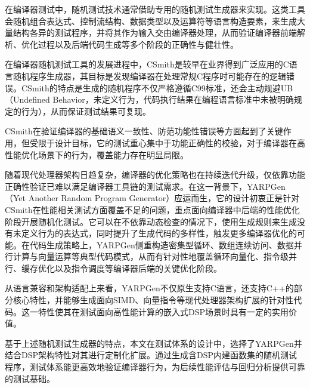 \par

在编译器测试中，随机测试技术通常借助专用的随机测试生成器来实现。这类工具会随机组合表达式、控制流结构、数据类型以及运算符等语言构造要素，来生成大量结构各异的测试程序，并将其作为输入交由编译器处理，从而验证编译器前端解析、优化过程以及后端代码生成等多个阶段的正确性与健壮性。

\par

在编译器随机测试工具的发展进程中，CSmith\cite{tamkun2021using}是较早在业界得到广泛应用的C语言随机程序生成器，其目标是发现编译器在处理常规C程序时可能存在的逻辑错误。CSmith的特点是生成的随机程序不仅严格遵循C99标准，还会主动规避UB（Undefined Behavior，未定义行为，代码执行结果在编程语言标准中未被明确规定的行为），从而保证测试结果可复现。

\par

CSmith在验证编译器的基础语义一致性、防范功能性错误等方面起到了关键作用，但受限于设计目标，它的测试重心集中于功能正确性的校验，对于编译器在高性能优化场景下的行为，覆盖能力存在明显局限。

\par

随着现代处理器架构日趋复杂，编译器的优化策略也在持续迭代升级，仅依靠功能正确性验证已难以满足编译器工具链的测试需求。在这一背景下，YARPGen（Yet Another Random Program Generator）\cite{livinskii2020random, livinskii2023fuzzing}应运而生，它的设计初衷正是针对CSmith在性能相关测试方面覆盖不足的问题，重点面向编译器中后端的性能优化阶段开展随机化测试。它可以在不依靠动态检查的情况下，使用生成规则来生成没有未定义行为的表达式，同时提升了生成代码的多样性，触发更多编译器优化的可能。在代码生成策略上，YARPGen侧重构造密集型循环、数组连续访问、数据并行计算与向量运算等典型代码模式，从而有针对性地覆盖循环向量化、指令级并行、缓存优化以及指令调度等编译器后端的关键优化阶段。

\par

从语言兼容和架构适配上来看，YARPGen不仅原生支持C语言，还支持C++的部分核心特性，并能够生成面向SIMD、向量指令等现代处理器架构扩展的针对性代码。这一特性使其在测试面向高性能计算的嵌入式DSP场景时具有一定的实用价值。

\par

基于上述随机测试生成器的特点，本文在测试体系的设计中，选择了YARPGen并结合DSP架构特性对其进行定制化扩展。通过生成含DSP内建函数集的随机测试程序，测试体系能更高效地验证编译器行为，为后续性能评估与回归分析提供可靠的测试基础。


